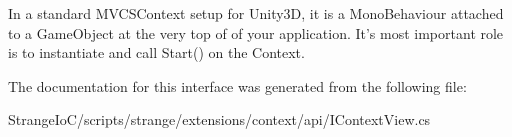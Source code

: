 In a standard M\-V\-C\-S\-Context setup for Unity3\-D, it is a Mono\-Behaviour attached to a Game\-Object at the very top of of your application. It's most important role is to instantiate and call {\ttfamily Start()} on the Context. 

The documentation for this interface was generated from the following file\-:\begin{DoxyCompactItemize}
\item 
Strange\-Io\-C/scripts/strange/extensions/context/api/I\-Context\-View.\-cs\end{DoxyCompactItemize}
